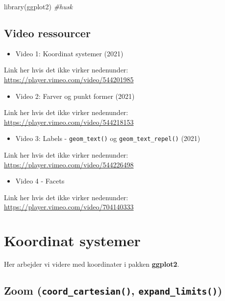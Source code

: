 \documentclass[
]{book}
\newenvironment{Shaded}{\begin{snugshade}}{\end{snugshade}}
\newcommand{\CommentTok}[1]{\textcolor[rgb]{0.56,0.35,0.01}{\textit{#1}}}
\newcommand{\FunctionTok}[1]{\textcolor[rgb]{0.00,0.00,0.00}{#1}}
\newcommand{\NormalTok}[1]{#1}
\providecommand{\tightlist}{%
  \setlength{\itemsep}{0pt}\setlength{\parskip}{0pt}}
\begin{document}
\begin{Shaded}
\begin{Highlighting}[]
\FunctionTok{library}\NormalTok{(ggplot2) }\CommentTok{\#husk}
\end{Highlighting}
\end{Shaded}

\hypertarget{video-ressourcer-1}{%
\subsection{Video ressourcer}\label{video-ressourcer-1}}

\begin{itemize}
\tightlist
\item
  Video 1: Koordinat systemer (2021)
\end{itemize}

Link her hvis det ikke virker nedenunder: \url{https://player.vimeo.com/video/544201985}

\begin{itemize}
\tightlist
\item
  Video 2: Farver og punkt former (2021)
\end{itemize}

Link her hvis det ikke virker nedenunder: \url{https://player.vimeo.com/video/544218153}

\begin{itemize}
\tightlist
\item
  Video 3: Labels - \texttt{geom\_text()} og \texttt{geom\_text\_repel()} (2021)
\end{itemize}

Link her hvis det ikke virker nedenunder: \url{https://player.vimeo.com/video/544226498}

\begin{itemize}
\tightlist
\item
  Video 4 - Facets
\end{itemize}

Link her hvis det ikke virker nedenunder: \url{https://player.vimeo.com/video/704140333}

\hypertarget{koordinat-systemer}{%
\section{Koordinat systemer}\label{koordinat-systemer}}

Her arbejder vi videre med koordinater i pakken \textbf{ggplot2}.

\hypertarget{zoom-coord_cartesian-expand_limits}{%
\subsection{\texorpdfstring{Zoom (\texttt{coord\_cartesian()}, \texttt{expand\_limits()})}{Zoom (coord\_cartesian(), expand\_limits())}}\label{zoom-coord_cartesian-expand_limits}}
\end{document}
